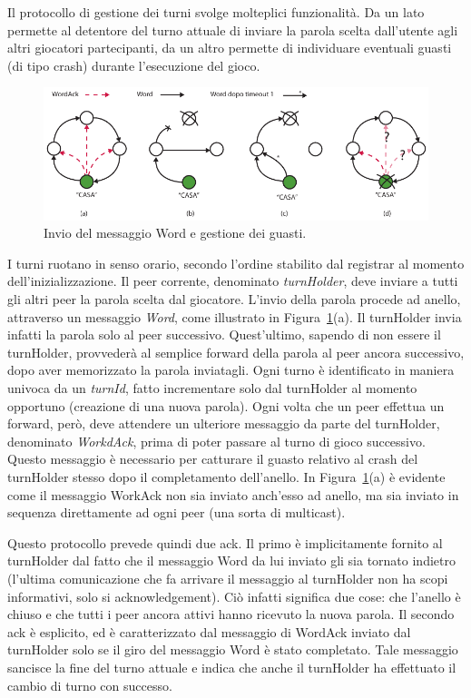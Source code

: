\documentclass[9pt]{article}
\begin{document}
Il protocollo di gestione dei turni svolge molteplici funzionalità. Da un lato permette al detentore del turno attuale di inviare la parola scelta dall'utente agli altri giocatori partecipanti, da un altro permette di individuare eventuali guasti (di tipo crash) durante l'esecuzione del gioco.

\begin{figure}
\centering
\includegraphics[scale=1]{imgs/Esempi.pdf}
\caption{Invio del messaggio Word e gestione dei guasti.}
\label{img:word}
\end{figure}

I turni ruotano in senso orario, secondo l'ordine stabilito dal registrar al momento dell'inizializzazione. Il peer corrente, denominato \emph{turnHolder}, deve inviare a tutti gli altri peer la parola scelta dal giocatore. L'invio della parola procede ad anello, attraverso un messaggio \emph{Word}, come illustrato in Figura~\ref{img:word}(a). Il turnHolder invia infatti la parola solo al peer successivo. Quest'ultimo, sapendo di non essere il turnHolder, provvederà al semplice forward della parola al peer ancora successivo, dopo aver memorizzato la parola inviatagli. Ogni turno è identificato in maniera univoca da un \emph{turnId}, fatto incrementare solo dal turnHolder al momento opportuno (creazione di una nuova parola). Ogni volta che un peer effettua un forward, però, deve attendere un ulteriore messaggio da parte del turnHolder, denominato \emph{WorkdAck}, prima di poter passare al turno di gioco successivo. Questo messaggio è necessario per catturare il guasto relativo al crash del turnHolder stesso dopo il completamento dell'anello. In Figura~\ref{img:word}(a) è evidente come il messaggio WorkAck non sia inviato anch'esso ad anello, ma sia inviato in sequenza direttamente ad ogni peer (una sorta di multicast).

Questo protocollo prevede quindi due ack. Il primo è implicitamente fornito al turnHolder dal fatto che il messaggio Word da lui inviato gli sia tornato indietro (l'ultima comunicazione che fa arrivare il messaggio al turnHolder non ha scopi informativi, solo si acknowledgement). Ciò infatti significa due cose: che l'anello è chiuso e che tutti i peer ancora attivi hanno ricevuto la nuova parola. Il secondo ack è esplicito, ed è caratterizzato dal messaggio di WordAck inviato dal turnHolder solo se il giro del messaggio Word è stato completato. Tale messaggio sancisce la fine del turno attuale e indica che anche il turnHolder ha effettuato il cambio di turno con successo.
\end{document}
